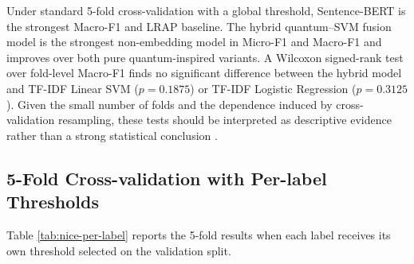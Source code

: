 \documentclass[runningheads]{llncs}
\begin{document}
\begin{table}[htbp]
\centering
\caption{Mean and standard deviation of 5-fold cross-validation results on the NICE multi-label dataset. Sentence-BERT achieves the highest LRAP; the hybrid quantum--SVM model obtains the highest Micro-F1 and Macro-F1 among non-embedding models and the lowest Hamming loss.}
\label{tab:nice-cv}
\end{table}

Under standard 5-fold cross-validation with a global threshold, Sentence-BERT
is the strongest Macro-F1 and LRAP baseline. The hybrid quantum--SVM fusion model is the
strongest non-embedding model in Micro-F1 and Macro-F1 and improves over both
pure quantum-inspired variants. A Wilcoxon signed-rank test over fold-level
Macro-F1 finds no significant difference between the hybrid model and TF-IDF
Linear SVM ($p=0.1875$) or TF-IDF Logistic Regression ($p=0.3125$). Given the
small number of folds and the dependence induced by cross-validation
resampling, these tests should be interpreted as descriptive evidence rather
than a strong statistical conclusion \cite{demsar2006statistical}.

\subsection{5-Fold Cross-validation with Per-label Thresholds}
Table \ref{tab:nice-per-label} reports the 5-fold results when each label
receives its own threshold selected on the validation split.
\end{document}
